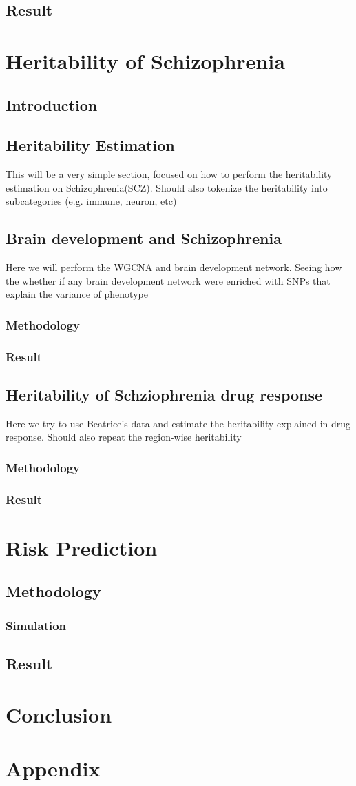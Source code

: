 \documentclass{book}
\begin{document}
	\section{Result}

	\chapter{Heritability of Schizophrenia}
	\section{Introduction}
	\section{Heritability Estimation}
	This will be a very simple section, focused on how to perform the heritability estimation on Schizophrenia(SCZ).
	Should also tokenize the heritability into subcategories (e.g. immune, neuron, etc)
	\section{Brain development and Schizophrenia}
	Here we will perform the WGCNA and brain development network.
	Seeing how the whether if any brain development network were enriched with SNPs that explain the variance of phenotype
	\subsection{Methodology}
	\subsection{Result}
	\section{Heritability of Schziophrenia drug response}
	Here we try to use Beatrice's data and estimate the heritability explained in drug response.
	Should also repeat the region-wise heritability
	\subsection{Methodology}
	\subsection{Result}
	
	\chapter{Risk Prediction}
	\section{Methodology}
	\subsection{Simulation}
	\section{Result}
	\chapter{Conclusion}
	\backmatter
	\printbibliography
	\chapter*{Appendix}
\end{document}
